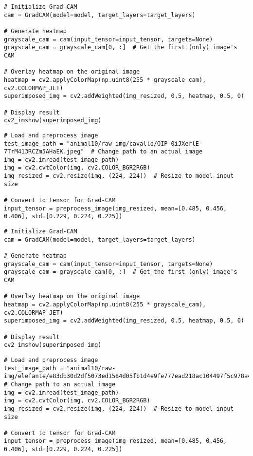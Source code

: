 \begin{verbatim}
# Initialize Grad-CAM
cam = GradCAM(model=model, target_layers=target_layers)

# Generate heatmap
grayscale_cam = cam(input_tensor=input_tensor, targets=None)
grayscale_cam = grayscale_cam[0, :]  # Get the first (only) image's CAM

# Overlay heatmap on the original image
heatmap = cv2.applyColorMap(np.uint8(255 * grayscale_cam), cv2.COLORMAP_JET)
superimposed_img = cv2.addWeighted(img_resized, 0.5, heatmap, 0.5, 0)

# Display result
cv2_imshow(superimposed_img)
\end{verbatim}

\begin{verbatim}
# Load and preprocess image
test_image_path = "animal10/raw-img/cavallo/OIP-0iJXerlE-7TrM413RCZm5AHaEK.jpeg"  # Change path to an actual image
img = cv2.imread(test_image_path)
img = cv2.cvtColor(img, cv2.COLOR_BGR2RGB)
img_resized = cv2.resize(img, (224, 224))  # Resize to model input size

# Convert to tensor for Grad-CAM
input_tensor = preprocess_image(img_resized, mean=[0.485, 0.456, 0.406], std=[0.229, 0.224, 0.225])
\end{verbatim}

\begin{verbatim}
# Initialize Grad-CAM
cam = GradCAM(model=model, target_layers=target_layers)

# Generate heatmap
grayscale_cam = cam(input_tensor=input_tensor, targets=None)
grayscale_cam = grayscale_cam[0, :]  # Get the first (only) image's CAM

# Overlay heatmap on the original image
heatmap = cv2.applyColorMap(np.uint8(255 * grayscale_cam), cv2.COLORMAP_JET)
superimposed_img = cv2.addWeighted(img_resized, 0.5, heatmap, 0.5, 0)

# Display result
cv2_imshow(superimposed_img)
\end{verbatim}

\begin{verbatim}
# Load and preprocess image
test_image_path = "animal10/raw-img/elefante/e83db30d2df5073ed1584d05fb1d4e9fe777ead218ac104497f5c978a4efbcb0_640.jpg"  # Change path to an actual image
img = cv2.imread(test_image_path)
img = cv2.cvtColor(img, cv2.COLOR_BGR2RGB)
img_resized = cv2.resize(img, (224, 224))  # Resize to model input size

# Convert to tensor for Grad-CAM
input_tensor = preprocess_image(img_resized, mean=[0.485, 0.456, 0.406], std=[0.229, 0.224, 0.225])
\end{verbatim}

